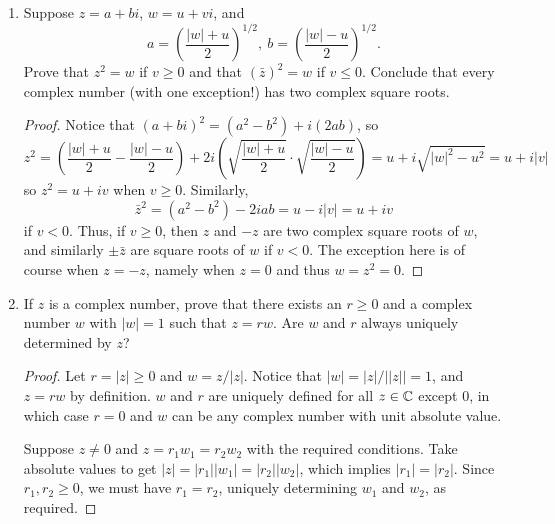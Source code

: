 \begin{enumerate}
\begin{proof}
This ordered set does not have the least-upper-bound property: consider the set $A = i\R = \{ir : r \in \R\}$, which is bounded above by $1$. We claim that though $A$ is non-empty and bounded above, there does not exist a least upper bound. Let $\alpha$ be an upper bound for $A$. Notice that $\alpha$ must have a non-negative real component. If $\alpha$ has a strictly positive real component, say $r$, then $r/2$ will be smaller than $r$ but still larger than all of $A$. Thus, a least upper bound will never have positive real component. If $\alpha$ had real component 0, then $\alpha + 1 \in A$ would be larger than it, a contradiction. Thus, no least upper bound for $A$ exists.
\end{proof}

\item Suppose $z = a + bi$, $w = u + vi$, and
\[
	a = \left(\frac{|w| + u}{2}\right)^{1/2},\ b = \left(\frac{|w| - u}{2}\right)^{1/2}.
\]
Prove that $z^2 = w$ if $v \ge 0$ and that $(\bar{z})^2 = w$ if $v \le 0$. Conclude that every complex number (with one exception!) has two complex square roots.

\begin{proof}
Notice that $(a + bi)^2 = (a^2 - b^2) + i(2ab)$, so
\[
	z^2 =  \left(\frac{|w| + u}{2} - \frac{|w| - u}{2} \right) + 2i \left( \sqrt{\frac{|w| + u}{2}} \cdot \sqrt{\frac{|w| - u}{2}} \right) = u + i \sqrt{|w|^2 - u^2} = u + i|v|
\]
so $z^2 = u + iv$ when $v \ge 0$. Similarly,
\[
	\bar{z}^2 = (a^2 - b^2) - 2iab = u - i|v| = u + iv
\]
if $v < 0$. Thus, if $v \ge 0$, then $z$ and $-z$ are two complex square roots of $w$, and similarly $\pm \bar{z}$ are square roots of $w$ if $v < 0$. The exception here is of course when $z = -z$, namely when $z = 0$ and thus $w = z^2 = 0$.
\end{proof}

\item If $z$ is a complex number, prove that there exists an $r \ge 0$ and a complex number $w$ with $|w| = 1$ such that $z = rw$. Are $w$ and $r$ always uniquely determined by $z$?

\begin{proof}
Let $r = |z| \ge 0$ and $w = z / |z|$. Notice that $|w| = |z| / ||z|| = 1$, and $z = rw$ by definition. $w$ and $r$ are uniquely defined for all $z \in \mathbb{C}$ except 0, in which case $r = 0$ and $w$ can be any complex number with unit absolute value.

Suppose $z \ne 0$ and $z = r_1 w_1 = r_2 w_2$ with the required conditions. Take absolute values to get $|z| = |r_1||w_1| = |r_2||w_2|$, which implies $|r_1| = |r_2|$. Since $r_1, r_2 \ge 0$, we must have $r_1 = r_2$, uniquely determining $w_1$ and $w_2$, as required.
\end{proof}


\end{enumerate}
